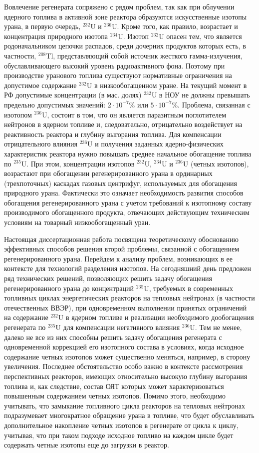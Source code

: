 Вовлечение регенерата сопряжено с рядом проблем, так как при облучении ядерного топлива в активной зоне реактора образуются искусственные изотопы урана, в первую очередь, $^{232}$U и $^{236}$U. Кроме того, как правило, возрастает и концентрация природного изотопа $^{234}$U. Изотоп $^{232}$U опасен тем, что является родоначальником цепочки распадов, среди дочерних продуктов которых есть,  в частности, $^{208}$Tl, представляющий собой источник жесткого гамма-излучения, обуславливающего высокий уровень радиоактивного фона. Поэтому при производстве уранового топлива существуют нормативные ограничения на допустимое содержание $^{232}$U в низкообогащенном уране. На текущий момент в РФ допустимые концентрации (в мас. долях) $^{232}$U в НОУ не должны превышать предельно допустимых значений: $2\cdot10^{-7}$\% или $5\cdot10^{-7}$\%. Проблема, связанная с изотопом $^{236}$U, состоит в том, что он является паразитным поглотителем нейтронов в ядерном топливе и, следовательно, отрицательно воздействует на реактивность реактора и глубину выгорания топлива. Для компенсации отрицательного влияния $^{236}$U и получения заданных ядерно-физических характеристик реактора нужно повышать среднее начальное обогащение топлива по $^{235}$U.  При этом, концентрации изотопов $^{232}$U, $^{234}$U и $^{236}$U (четных изотопов), возрастают при обогащении регенерированного урана в ординарных (трехпоточных) каскадах газовых центрифуг, используемых для обогащения природного урана. Фактически это означает необходимость развития способов обогащения регенерированного урана с учетом требований к изотопному составу производимого обогащенного продукта, отвечающих действующим техническим условиям на товарный низкообогащенный уран.

Настоящая диссертационная работа посвящена теоретическому обоснованию эффективных способов решения второй проблемы, связанной с обогащением регенерированного урана.
Перейдем к анализу проблем, возникающих в ее контексте для технологий разделения изотопов. На сегодняшний день предложен ряд технических решений, позволяющих решить задачу обогащения регенерированного урана до концентраций $^{235}$U, требуемых в современных топливных циклах энергетических реакторов на тепловых нейтронах (в частности отечественных ВВЭР), при одновременном выполнении принятых ограничений на содержание $^{232}$U в ядерном топливе и реализации необходимого дообогащения регенерата по $^{235}$U для компенсации негативного влияния $^{236}$U. Тем не менее, далеко не все из них способны решить задачу обогащения регенерата с одновременной коррекцией его изотопного состава в условиях, когда исходное содержание четных изотопов может существенно меняться, например, в сторону увеличения. Последнее обстоятельство особо важно в контексте рассмотрения перспективных реакторов, имеющих относительно высокую глубину выгорания топлива и, как следствие, состав ОЯТ которых может характеризоваться повышенным содержанием четных изотопов. Помимо этого, необходимо учитывать, что замыкание топливного цикла реакторов на тепловых нейтронах подразумевает многократное обращение урана в топливе, что будет обуславливать дополнительное накопление четных изотопов в регенерате от цикла к циклу, учитывая, что при таком подходе исходное топливо на каждом цикле будет содержать четные изотопы еще до загрузки в реактор.

